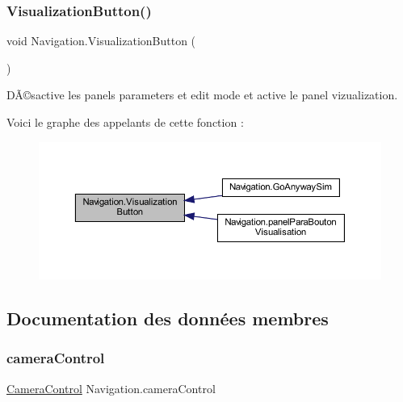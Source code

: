 \subsubsection{\texorpdfstring{Visualization\+Button()}{VisualizationButton()}}
{\footnotesize\ttfamily void Navigation.\+Visualization\+Button (\begin{DoxyParamCaption}{ }\end{DoxyParamCaption})\hspace{0.3cm}{\ttfamily [inline]}}



DÃ©sactive les panels parameters et edit mode et active le panel vizualization. 

Voici le graphe des appelants de cette fonction \+:\nopagebreak
\begin{figure}[H]
\begin{center}
\leavevmode
\includegraphics[width=350pt]{class_navigation_ad4dbf103497aef10cc636c40f84dbdde_icgraph}
\end{center}
\end{figure}


\subsection{Documentation des données membres}
\mbox{\label{class_navigation_a8ee62aef67edcc54d1478d20c22fff12}} 
\subsubsection{\texorpdfstring{camera\+Control}{cameraControl}}
{\footnotesize\ttfamily \mbox{\hyperlink{class_camera_control}{Camera\+Control}} Navigation.\+camera\+Control\hspace{0.3cm}{\ttfamily [private]}}



